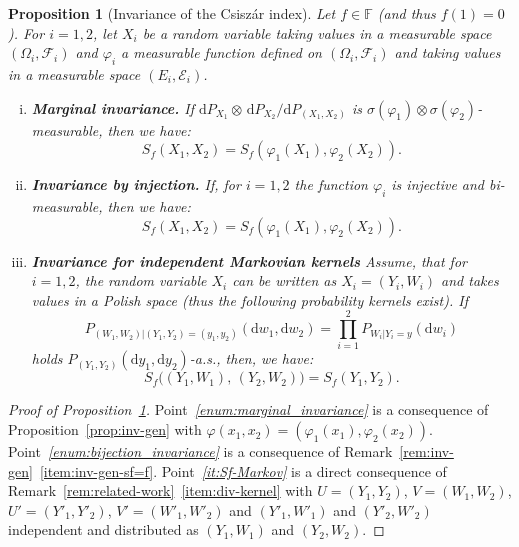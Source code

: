\documentclass[12pt]{article}
\newcommand{\ce}{{\mathcal E}}
\newcommand{\cf}{{\mathcal F}}
\newcommand{\F}{{\mathbb F}}
\newcommand{\rd}{\mathrm{d}}
\theoremstyle{plain}
\newtheorem{prop}[theo]{Proposition}
\theoremstyle{remark}
\begin{document}
\begin{prop}[Invariance of the Csisz\'ar index]
\label{prop:invariance_csiszar_index}
Let $f \in \F$ (and thus $f(1)=0$). For $i=1,2$, let $X_i$ be a random variable taking values in  a measurable
space $(\Omega_i, \cf_i)$ and $\varphi_i$ a measurable function defined
on $(\Omega_i, \cf_i)$ and taking values in a  mea\-su\-rable
space $(E      _i, \ce_i)$. 
    \begin{enumerate}[(i)]
    \item \textbf{Marginal invariance.} \label{enum:marginal_invariance}
   If $\rd P_{X_1} \otimes \, \rd P_{X_2} / \rd P _{(X_1,X_2)}$
    is $\sigma(\varphi_1) \otimes \sigma(\varphi_2)$-mea\-su\-rable, then
    we have:
    \[
      S_f(X_1, X_2)=S_f(\varphi_1(X_1), \varphi_2 (X_2)). 
    \]

  \item\textbf{Invariance by injection.}
  \label{enum:bijection_invariance}
 If,  for $i=1, 2$ the function  $\varphi_i$ is injective and bi-measurable, then
    we have:
    \[
      S_f(X_1, X_2)=S_f(\varphi_1(X_1), \varphi_2 (X_2)). 
    \]

 \item\textbf{Invariance for independent Markovian kernels} 
\label{it:Sf-Markov}
Assume, that  for $i=1,2$, the random  variable $X_i$ can be  written as
$X_i=(Y_i, W_i)$ and  takes values in a Polish space  (thus  the
following         probability         kernels        exist).          If
$$
P_{(W_1, W_2)|(Y_1,  Y_2)=(y_1, y_2)}(\rd w_1, \rd  w_2)= \prod_{i=1}^2
P_{W_i|Y_i=y} (\rd w_i)
$$ 
holds $P_{(Y_1, Y_2)}(\rd y_1, \rd y_2)$-a.s., then, we have:
    \[
      S_f\big((Y_1, W_1),\,  (Y_2, W_2)\big)=S_f(Y_1, Y_2). 
    \] 
  \end{enumerate}
\end{prop}


\begin{proof}[Proof of Proposition~\ref{prop:invariance_csiszar_index}]
 Point{\it ~\ref{enum:marginal_invariance}} is a consequence of Proposition~\ref{prop:inv-gen} with $\varphi(x_1, x_2)=(\varphi_1(x_1),\varphi_2(x_2))$. Point{\it ~\ref{enum:bijection_invariance}} is a consequence of Remark~\ref{rem:inv-gen}~\ref{item:inv-gen-sf=f}. 
 Point{\it ~\ref{it:Sf-Markov}} is a direct consequence of
 Remark~\ref{rem:related-work}~\ref{item:div-kernel} with 
 $U=(Y_1, Y_2)$, $V=(W_1, W_2)$, $U'=(Y'_1, Y'_2)$, $V'=(W'_1, W'_2)$
 and $(Y'_1, W'_1)$ and $(Y'_2, W'_2)$ independent and distributed as $(Y_1, W_1)$ and $(Y_2, W_2)$. 
\end{proof}
\end{document}
